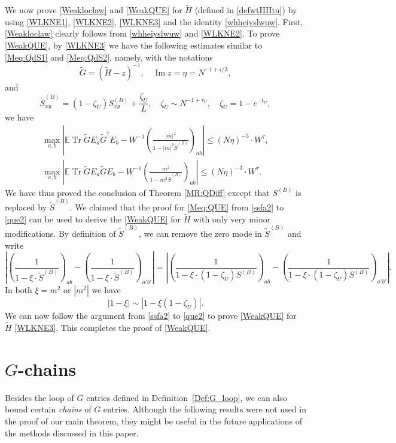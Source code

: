 \documentclass[10pt,reqno]{article}
\DeclareMathOperator{\im}{{\mathrm{Im}}}
\DeclareMathOperator{\tr}{Tr}
\theoremstyle{plain} %
\theoremstyle{remark}
\numberwithin{equation}{section}
\begin{document}
We now prove  \eqref{Weakloclaw} and  \eqref{WeakQUE} for $\widetilde{H}$ (defined in \eqref{defwtHHtu}) by using  \eqref{WLKNE1}, \eqref{WLKNE2}, \eqref{WLKNE3} and the identity \eqref{whheiyslwuw}. First, \eqref{Weakloclaw} clearly follows from  \eqref{whheiyslwuw} and \eqref{WLKNE2}. To prove \eqref{WeakQUE},  by  \eqref{WLKNE3}  we have  the following estimates similar to  \eqref{Meq:QdS1} and \eqref{Meq:QdS2}, namely, with the notations 
$$\widetilde{G}=(\widetilde{H}-z)^{-1},\quad  \im z=\eta=N^{-1+\mathfrak c/ 3}, 
$$ 
and 
 \[
  \widetilde{S}^{(B)}_{xy}  = (1-\zeta_U) S^{(B)}_{xy} + \frac{\zeta_U}{L}, \quad \zeta_U \sim  N^{-1+\tau_U}, \quad \zeta_U=1-e^{-t_U}, 
\]
 we have 
  \begin{align} 
 \max_{a,b }   \left|\mathbb E\tr \widetilde{G} E_a \widetilde{G}^\dagger E_b- W^{-1}\left(\frac{|m|^2}{1-|m|^2 \widetilde{S}^{(B)}} \right)_{ab}\right|\le  \left(N\eta \right)^{-3} \cdot W^\tau,   \\
 \nonumber
 \max_{a,b }   \left|\mathbb E\tr \widetilde{G} E_a \widetilde{G}  E_b- W^{-1}\left(\frac{m^2}{1-m^2 \widetilde{S}^{(B)}} \right)_{ab}\right|\le \left(N\eta \right)^{-3} \cdot W^\tau   .
\end{align}
We have thus proved the  conclusion of Theorem \ref{MR:QDiff} except that $S^{(B)}$ is replaced by $\widetilde{S}^{(B)}$.  We claimed that  the proof for \eqref{Meq:QUE} 
from \eqref{ssfa2} to \eqref{que2} can be used 
to derive the   \eqref{WeakQUE} for $\widetilde{H}$ with only very minor modifications.
By definition of $\widetilde{S}^{(B)}$, we can remove the zero mode in $\widetilde{S}^{(B)}$ and write
  $$\left| \left(\frac{1}{1-\xi\cdot \widetilde{S}^{(B)}}\right)_{ab}-\left(\frac{1}{1-\xi\cdot \widetilde{S}^{(B)}}\right)_{a'b'}\right|
 =
 \left| \left(\frac{1}{1-\xi\cdot  (1-\zeta_U){S}^{(B)}}\right)_{ab}-\left(\frac{1}{1-\xi\cdot  (1-\zeta_U){S}^{(B)}}\right)_{a'b'}\right|.
 $$
In both  $\xi=m^2$ or $|m^2|$ we have 
$$
|1-\xi |\sim |1-\xi (1-\zeta_U)|.
$$
We can now follow the argument from \eqref{ssfa2} to \eqref{que2} to prove 
\eqref{WeakQUE} for $\widetilde{H}$ \eqref{WLKNE3}. This completes the proof of \eqref{WeakQUE}. 
 
 
\appendix
 \section{\texorpdfstring{$G$}{G}-chains}
 Besides the loop of \( G \) entries defined in Definition~\ref{Def:G_loop}, we can also bound certain \textit{chains} of \( G \) entries. Although the following  results were not used in the proof of our main theorem, they might  be useful in the future applications of the methods discussed  in this paper. 
\end{document}
